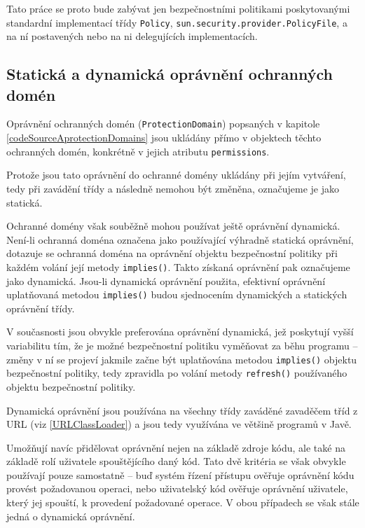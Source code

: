 Tato práce se proto bude zabývat jen bezpečnostními politikami poskytovanými standardní implementací třídy {\tt Policy}, {\tt sun.security.provider.PolicyFile}, a na ní postavených nebo na ni delegujících implementacích.

\subsection{Statická a dynamická oprávnění ochranných domén} \label{staticPerm}

Oprávnění ochranných domén ({\tt ProtectionDomain}) popsaných v kapitole \ref{codeSourceAprotectionDomains} jsou ukládány přímo v objektech těchto ochranných domén,
konkrétně v jejich atributu {\tt permissions}.~\cite{sourceProtectionDomain}

Protože jsou tato oprávnění do ochranné domény ukládány při jejím vytváření, tedy při zavádění třídy a následně nemohou být změněna, označujeme je jako statická.

Ochranné domény však souběžně mohou používat ještě oprávnění dynamická. Není-li ochranná doména označena jako používající výhradně statická oprávnění,
dotazuje se ochranná doména na oprávnění objektu bezpečnostní politiky při každém volání její metody {\tt implies()}.
Takto získaná oprávnění pak označujeme jako dynamická. \cite{sourceProtectionDomain}
Jsou-li dynamická oprávnění použita, efektivní oprávnění uplatňovaná metodou {\tt implies()} budou sjednocením dynamických a statických oprávnění třídy.
\cite{sourceProtectionDomain}

V současnosti jsou obvykle preferována oprávnění dynamická, jež poskytují vyšší variabilitu tím, že je možné bezpečnostní politiku vyměňovat za běhu
programu -- změny v ní se projeví jakmile začne být uplatňována metodou {\tt implies()} objektu bezpečnostní politiky, tedy zpravidla po volání metody
{\tt refresh()} používaného objektu bezpečnostní politiky.

Dynamická oprávnění jsou používána na všechny třídy zaváděné zavaděčem tříd z URL (viz \ref{URLClassLoader}) a jsou tedy využívána ve většině programů v Javě.
\cite{sourceURLClassLoader}

Umožňují navíc přidělovat oprávnění nejen na základě zdroje kódu, ale také na základě rolí uživatele spouštějícího daný kód. Tato dvě kritéria se však
obvykle používají pouze samostatně -- buď systém řízení přístupu ověřuje oprávnění kódu provést požadovanou operaci, nebo uživatelský kód ověřuje oprávnění
uživatele, který jej spouští, k provedení požadované operace. V obou případech se však stále jedná o dynamická oprávnění.

